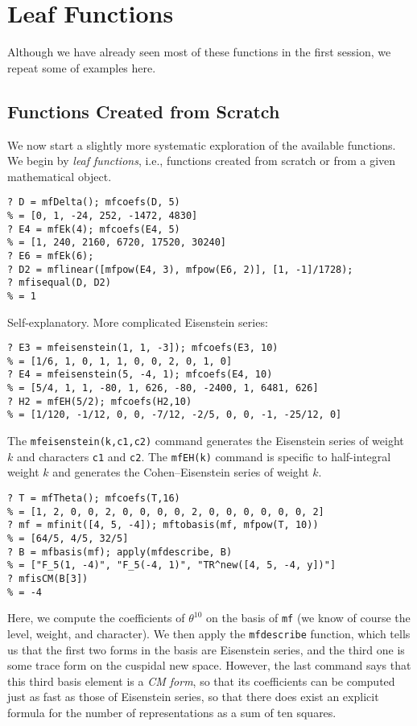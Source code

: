 \documentclass[11pt]{article}
\renewcommand{\th}{\theta}
\def\kbd#1{{\tt #1}}
\begin{document}
\section{Leaf Functions}

Although we have already seen most of these functions in the first session,
we repeat some of examples here.

\subsection{Functions Created from Scratch}

We now start a slightly more systematic exploration of the available functions.
We begin by \emph{leaf functions}, i.e., functions created from scratch or
from a given mathematical object.

\begin{verbatim}
? D = mfDelta(); mfcoefs(D, 5)
% = [0, 1, -24, 252, -1472, 4830]
? E4 = mfEk(4); mfcoefs(E4, 5)
% = [1, 240, 2160, 6720, 17520, 30240]
? E6 = mfEk(6);
? D2 = mflinear([mfpow(E4, 3), mfpow(E6, 2)], [1, -1]/1728);
? mfisequal(D, D2)
% = 1
\end{verbatim}

  Self-explanatory. More complicated Eisenstein series:

\begin{verbatim}
? E3 = mfeisenstein(1, 1, -3]); mfcoefs(E3, 10)
% = [1/6, 1, 0, 1, 1, 0, 0, 2, 0, 1, 0]
? E4 = mfeisenstein(5, -4, 1); mfcoefs(E4, 10)
% = [5/4, 1, 1, -80, 1, 626, -80, -2400, 1, 6481, 626]
? H2 = mfEH(5/2); mfcoefs(H2,10)
% = [1/120, -1/12, 0, 0, -7/12, -2/5, 0, 0, -1, -25/12, 0]
\end{verbatim}

The \kbd{mfeisenstein(k,c1,c2)} command generates the Eisenstein series of weight
$k$ and characters \kbd{c1} and \kbd{c2}. The \kbd{mfEH(k)} command is specific
to half-integral weight $k$ and generates the Cohen--Eisenstein series of
weight $k$.

\begin{verbatim}
? T = mfTheta(); mfcoefs(T,16)
% = [1, 2, 0, 0, 2, 0, 0, 0, 0, 2, 0, 0, 0, 0, 0, 0, 2]
? mf = mfinit([4, 5, -4]); mftobasis(mf, mfpow(T, 10))
% = [64/5, 4/5, 32/5]
? B = mfbasis(mf); apply(mfdescribe, B)
% = ["F_5(1, -4)", "F_5(-4, 1)", "TR^new([4, 5, -4, y])"]
? mfisCM(B[3])
% = -4
\end{verbatim}

  Here, we compute the coefficients of $\th^{10}$ on the basis of \kbd{mf}
  (we know of course the level, weight, and character). We then apply
  the \kbd{mfdescribe} function, which tells us that the first two forms in
  the basis are Eisenstein series, and the third one is some trace form
  on the cuspidal new space. However, the last command says that this third
  basis element is a \emph{CM form}, so that its coefficients can be computed
  just as fast as those of Eisenstein series, so that there does exist
  an explicit formula for the number of representations as a sum of ten
  squares.
\end{document}
